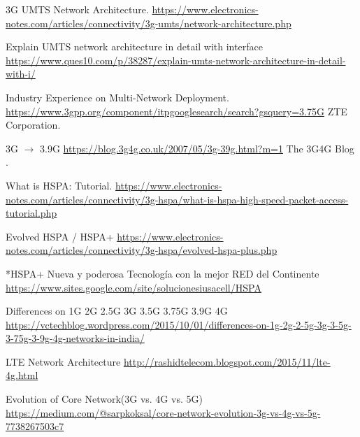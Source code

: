 \begin{thebibliography}{9}
3G UMTS Network Architecture. \href{https://www.electronics-notes.com/articles/connectivity/3g-umts/network-architecture.php}{https://www.electronics-notes.com/articles/connectivity/3g-umts/network-architecture.php}

Explain UMTS network architecture in detail with interface \href{https://www.ques10.com/p/38287/explain-umts-network-architecture-in-detail-with-i/}{https://www.ques10.com/p/38287/explain-umts-network-architecture-in-detail-with-i/}


Industry Experience on Multi-Network Deployment.\\ \href{https://www.3gpp.org/component/itpgooglesearch/search?gsquery=3.75G}{https://www.3gpp.org/component/itpgooglesearch/search?gsquery=3.75G} ZTE Corporation.

3G $\longrightarrow$ 3.9G \href{https://blog.3g4g.co.uk/2007/05/3g-39g.html?m=1}{https://blog.3g4g.co.uk/2007/05/3g-39g.html?m=1} The 3G4G Blog .

What is HSPA: Tutorial. \href{https://www.electronics-notes.com/articles/connectivity/3g-hspa/what-is-hspa-high-speed-packet-access-tutorial.php}{https://www.electronics-notes.com/articles/connectivity/3g-hspa/what-is-hspa-high-speed-packet-access-tutorial.php}

Evolved HSPA / HSPA+  \href{https://www.electronics-notes.com/articles/connectivity/3g-hspa/evolved-hspa-plus.php}{https://www.electronics-notes.com/articles/connectivity/3g-hspa/evolved-hspa-plus.php}

*HSPA+  Nueva y poderosa Tecnología con la mejor RED del Continente  \href{https://www.sites.google.com/site/solucionesiusacell/HSPA}{https://www.sites.google.com/site/solucionesiusacell/HSPA}

Differences on 1G 2G 2.5G 3G 3.5G 3.75G 3.9G 4G  \href{https://vctechblog.wordpress.com/2015/10/01/differences-on-1g-2g-2-5g-3g-3-5g-3-75g-3-9g-4g-networks-in-india/}{https://vctechblog.wordpress.com/2015/10/01/differences-on-1g-2g-2-5g-3g-3-5g-3-75g-3-9g-4g-networks-in-india/}

LTE Network Architecture  \href{http://rashidtelecom.blogspot.com/2015/11/lte-4g.html}{http://rashidtelecom.blogspot.com/2015/11/lte-4g.html}

Evolution of Core Network(3G vs. 4G vs. 5G)  \href{https://medium.com/@sarpkoksal/core-network-evolution-3g-vs-4g-vs-5g-7738267503c7}{https://medium.com/@sarpkoksal/core-network-evolution-3g-vs-4g-vs-5g-7738267503c7}


\end{thebibliography}
